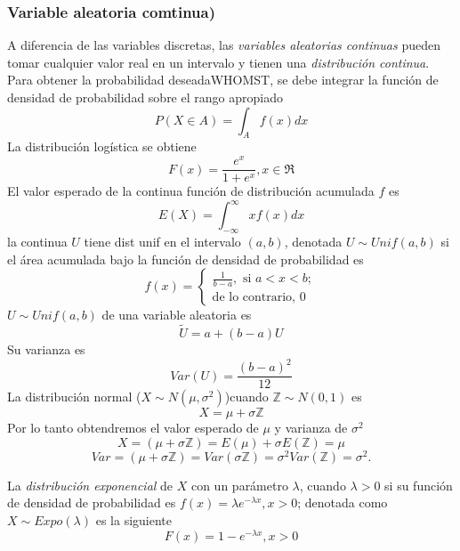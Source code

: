 \subsubsection{Variable aleatoria comtinua)}
A diferencia de las variables discretas, las \emph{variables aleatorias continuas} pueden tomar cualquier valor real en un intervalo y tienen una \emph{distribución continua}. Para obtener la probabilidad deseadaWHOMST, se debe integrar la función de densidad de probabilidad sobre el rango apropiado
\begin{equation}
P(X\in A)=\int_{A}f(x)dx
\end{equation}
La distribución logística se obtiene
\begin{equation}
F(x)=\frac{e^x}{1+e^x}, x\in\Re
\end{equation}
El valor esperado de la continua función de distribución acumulada $f$ es
\begin{equation}
E(X)=\int_{-\infty}^{\infty}xf(x)dx
\end{equation}
la continua $U$ tiene dist unif en el intervalo $(a,b)$, denotada $U \sim Unif(a,b)$ si el área acumulada bajo la función de densidad de probabilidad es
\begin{equation}
f(x)=\begin{cases}
\frac{1}{b-a},\text{ si }a<x<b;\\
\text{de lo contrario, }0
\end{cases}
\end{equation}
$U \sim Unif(a,b)$ de una variable aleatoria es
\begin{equation}
\tilde{U}=a+(b-a)U
\end{equation}
Su varianza es
\begin{equation}
Var(U)=\frac{{(b-a)}^2}{12}
\end{equation}
La distribución normal ($X \sim N(\mu,\sigma^2)$)cuando $\mathbb{Z} \sim N(0,1)$ es
\begin{equation}
X=\mu+\sigma\mathbb{Z}
\end{equation}
Por lo tanto obtendremos el valor esperado de $\mu$ y varianza de $\sigma^2$
\begin{equation}
X=(\mu+\sigma\mathbb{Z})=E(\mu)+\sigma E(\mathbb{Z})=\mu
\end{equation}
\begin{equation}
Var=(\mu+\sigma\mathbb{Z})=Var(\sigma\mathbb{Z})=\sigma^2Var(\mathbb{Z})=\sigma^2.
\end{equation}

La \emph{distribución exponencial} de $X$ con un parámetro $\lambda$, cuando $\lambda>0$ si su función de densidad de probabilidad es $f(x)=\lambda e^{-\lambda x} , x>0$; denotada como $X \sim Expo(\lambda)$ es la siguiente
\begin{equation}
F(x)=1-e^{-\lambda x}, x>0
\end{equation}
